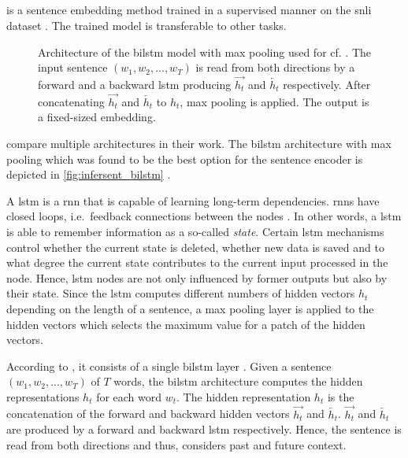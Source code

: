 \subsection{\infersent{}}\label{subsec:inferSent}

\infersent{} is a sentence embedding method trained in a supervised manner on the \ac{snli} dataset \cite{inferSent2018, HfsentTrans2019}.
The trained model is transferable to other tasks.

\begin{figure}[!htb] %
    \centering
    
    \caption[Architecture of \infersent{}]{Architecture of the \acs*{bilstm} model with max pooling used for \infersent{} cf. \cite{inferSent2018}.
    The input sentence $(w_1, w_2, ..., w_T)$ is read from both directions by a forward and a backward \acs*{lstm} 
    producing $\overrightarrow{h_t}$ and $\overleftarrow{h_t}$ respectively.
    After concatenating $\overrightarrow{h_t}$ and $\overleftarrow{h_t}$ to $h_t$, max pooling is applied.
    The output is a fixed-sized embedding.
    }
    \label{fig:infersent_bilstm}
\end{figure}

\citeauthor{inferSent2018} compare multiple architectures in their work.
The \ac{bilstm} architecture with max pooling which was found to be the best option for the sentence encoder 
is depicted in \autoref{fig:infersent_bilstm} \cite{inferSent2018}.

A \ac{lstm} is a \ac{rnn} that is capable of learning long-term dependencies.
\acp{rnn} have closed loops, i.e.\ feedback connections between the nodes \cite{rnn_book2001}.
In other words, 
a \ac{lstm} is able to remember information as a so-called \textit{state}.
Certain \ac{lstm} mechanisms control whether the current state is deleted, whether new data is saved and 
to what degree the current state contributes to the current input processed in the node.
Hence, \ac{lstm} nodes are not only influenced by former outputs but also by their state.
Since the \ac{lstm} computes different numbers of hidden vectors $h_t$ depending on the length of a sentence, 
a max pooling layer is applied to the hidden vectors which selects the maximum value for a patch of the hidden vectors.

According to \citeauthor{HfsentTrans2019}, it consists of a single \ac{bilstm} layer \cite{HfsentTrans2019}.
Given a sentence $(w_1, w_2, ..., w_T)$ of $T$ words, the \ac{bilstm} architecture computes the hidden representations $h_t$ for each word $w_t$.
The hidden representation $h_t$ is the concatenation of the forward and backward hidden vectors $\overrightarrow{h_t}$ and $\overleftarrow{h_t}$.
$\overrightarrow{h_t}$ and $\overleftarrow{h_t}$ are produced by a forward and backward \ac{lstm} respectively.
Hence, the sentence is read from both directions and thus, considers past and future context.